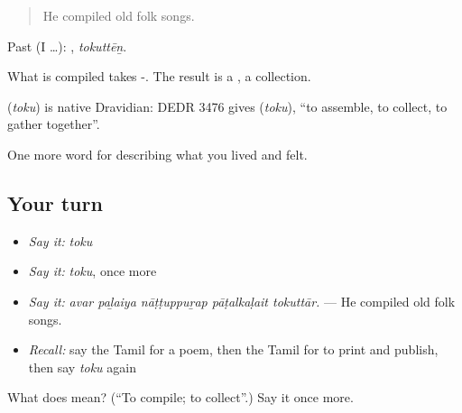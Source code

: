 \begin{quote}
He compiled old folk songs.
\end{quote}

Past (I …): , \emph{tokuttēṉ}.

What is compiled takes -. The result is a , a collection.

\begin{cousinweb}
\textbf{} (\emph{toku}) is native Dravidian: DEDR 3476 gives  (\emph{toku}), \textquotedblleft{}to assemble, to collect, to gather together\textquotedblright{}.
\end{cousinweb}

\begin{grammarlens}[title={What you've built}]
One more word for describing what you lived and felt.
\end{grammarlens}

\subsection*{Your turn}
\begin{itemize}
\raggedright
  \item \emph{Say it:} \emph{toku}
  \item \emph{Say it:} \emph{toku}, once more
  \item \emph{Say it:} \emph{avar paḻaiya nāṭṭuppuṟap pāṭalkaḷait tokuttār.} — He compiled old folk songs.
  \item \emph{Recall:} say the Tamil for a poem, then the Tamil for to print and publish, then say \emph{toku} again
\end{itemize}

\begin{tcolorbox}[breakable,colback=teal!4,colframe=teal!35!black,title={Before you move on}]
What does  mean? (\textquotedblleft{}To compile; to collect\textquotedblright{}.) Say it once more.
\end{tcolorbox}
